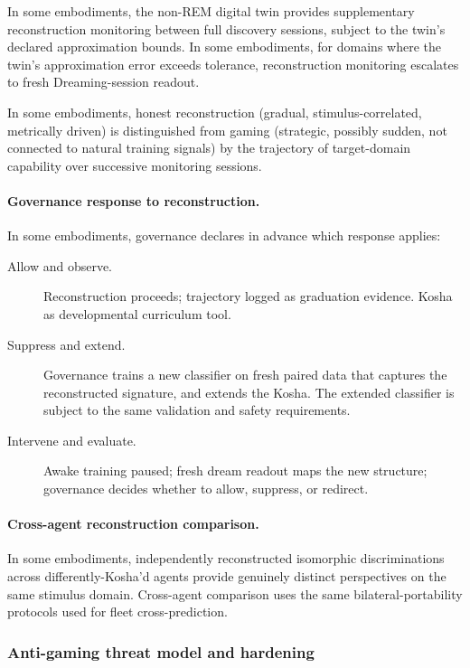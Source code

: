 \documentclass[a4paper,12pt]{article}
\begin{document}
In some embodiments, the non-REM digital twin provides supplementary
reconstruction monitoring between full discovery sessions, subject to
the twin's declared approximation bounds. In some embodiments, for
domains where the twin's approximation error exceeds tolerance,
reconstruction monitoring escalates to fresh Dreaming-session readout.

In some embodiments, honest reconstruction (gradual,
stimulus-correlated, metrically driven) is distinguished from gaming
(strategic, possibly sudden, not connected to natural training
signals) by the trajectory of target-domain capability over
successive monitoring sessions.

\paragraph{Governance response to reconstruction.}
In some embodiments, governance declares in advance which response
applies:

\begin{description}
  \item[Allow and observe.] Reconstruction proceeds; trajectory
    logged as graduation evidence. Kosha as developmental curriculum
    tool.
  \item[Suppress and extend.] Governance trains a new classifier on
    fresh paired data that captures the reconstructed signature, and
    extends the Kosha. The extended classifier is subject to the
    same validation and safety requirements.
  \item[Intervene and evaluate.] Awake training paused; fresh dream
    readout maps the new structure; governance decides whether to
    allow, suppress, or redirect.
\end{description}

\paragraph{Cross-agent reconstruction comparison.}
In some embodiments, independently reconstructed isomorphic
discriminations across differently-Kosha'd agents provide genuinely
distinct perspectives on the same stimulus domain. Cross-agent
comparison uses the same bilateral-portability protocols used for
fleet cross-prediction.

\subsubsection{Anti-gaming threat model and hardening}
\end{document}
